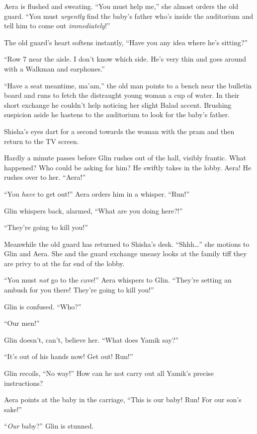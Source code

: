 \documentclass[twoside,11pt]{book}
\begin{document}
Aera is flushed and sweating. ``You must help me,'' she almost orders the old guard.
``You must \textit{urgently} find the baby's father who's inside the auditorium and tell him to come out
\textit{immediately}!''

The old guard's heart softens instantly, ``Have you any idea where he's sitting?''

``Row 7 near the aisle. I don't know which side. He's very thin and goes around with a Walkman and
earphones.''

``Have a seat meantime, ma'am,'' the old man points to a bench near the bulletin board and runs to fetch
the distraught young woman a cup of water. In their short exchange he couldn't help noticing her slight Balad accent.
Brushing suspicion aside he hastens to the auditorium to look for the baby's father.

Shisha's eyes dart for a second towards the woman with the pram and then
return to the TV screen.

Hardly a minute passes before Glin rushes out of the hall, visibly frantic. What happened? Who could be asking for him?
He swiftly takes in the lobby. Aera! He rushes over to her. ``Aera!''

``You \textit{have} to get out!'' Aera orders him in a whisper.
``Run!''

Glin whispers back, alarmed, ``What are you doing here?!''

``They're going to kill you!''

Meanwhile the old guard has returned to Shisha's desk. ``Shhh{\dots}'' she motions to Glin and
Aera. She and the guard exchange uneasy looks at the family tiff they are
privy to at the far end of the lobby.

``You\textit{ }must\textit{ not} go to the cave!'' Aera whispers to Glin.
``They're setting an ambush for you there! They're going to kill you!''

Glin is confused. ``Who?'' \

``Our men!''

Glin doesn't, can't, believe her. ``What does Yamik say?''

``It's out of his hands now! Get out! Run!''

Glin recoils, ``No way!'' How can he not carry out all Yamik's precise instructions?

Aera points at the baby in the carriage, ``This is our baby! Run! For our son's sake!''

``\textit{Our }baby?'' Glin is stunned.
\end{document}
